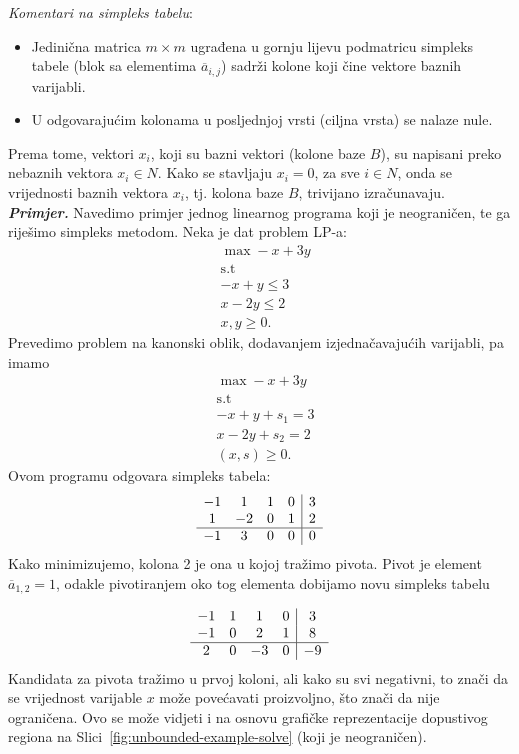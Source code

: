 \documentclass[a4paper, utf8, 11pt, colorlinks]{book}
\begin{document}
 \emph{Komentari na simpleks tabelu}:
 \begin{itemize}
     \item Jedinična matrica $m \times m$   ugrađena u gornju lijevu podmatricu simpleks tabele (blok sa elementima $\overline{a}_{i,j}$) sadrži kolone koji čine vektore baznih varijabli.
     \item U odgovarajućim kolonama u posljednjoj vrsti (ciljna vrsta) se nalaze nule.
 \end{itemize}
 Prema tome, vektori $x_i$, koji su bazni vektori (kolone baze $B$), su napisani preko nebaznih vektora $x_i \in N$. Kako se stavljaju $x_i  = 0$, za sve $i \in N$, onda se  vrijednosti baznih vektora $x_i$, tj. kolona baze $B$, trivijano izračunavaju.
 \vspace{1cm}\\
 \emph{\textbf{Primjer.}} Navedimo primjer jednog linearnog programa koji je neograničen, te ga riješimo simpleks metodom. 
  Neka je dat problem LP-a:
  \begin{align*}
  	  &\max -x + 3y \\
  	  & \mbox{s.t} \nonumber \\
  	  & -x + y \leq 3 \\
  	  & x - 2y \leq 2 \\
  	  & x,y \geq 0.
  \end{align*}
 Prevedimo problem na kanonski oblik, dodavanjem izjednačavajućih varijabli, pa imamo 
 \begin{align*}
      &\max -x + 3y \\
      & \mbox{s.t} \nonumber \\
     & -x + y + s_1 = 3 \\
     & x - 2y + s_2 = 2  \\
     & (x,s) \geq 0.
 \end{align*}
Ovom programu odgovara simpleks tabela:
$$\begin{array}{cccc| c} 
	   -1 & 1  & 1 & 0 & 3 \\
	    1 & -2 & 0 & 1 & 2 \\ \hline
	   -1 & 3  & 0 & 0 & 0  
\end{array}$$
Kako minimizujemo,  kolona 2 je ona u kojoj tražimo pivota. Pivot je element 
$\overline{a}_{1, 2} = 1$, odakle pivotiranjem oko tog elementa dobijamo novu simpleks tabelu 

$$\begin{array}{cccc| c} 
		   -1 & 1  & 1  &  0 & 3 \\
		   -1 & 0  & 2  &  1 & 8 \\ \hline
		   2  & 0  & -3 &  0 & -9 \\
\end{array}$$
Kandidata za pivota tražimo u prvoj koloni, ali kako su svi negativni, to znači da se 
vrijednost  varijable $x$  može povećavati proizvoljno, što znači da nije ograničena. 
Ovo se može vidjeti i na osnovu grafičke reprezentacije dopustivog regiona na Slici~\ref{fig:unbounded-example-solve} (koji je neograničen). 
\end{document}
